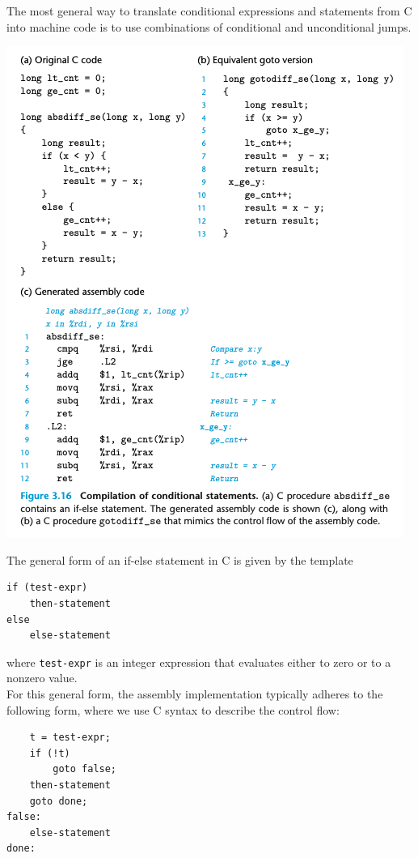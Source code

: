 \documentclass[11pt]{article}
\begin{document}
The most general way to translate conditional expressions and statements from C into machine code is to use combinations of conditional and unconditional jumps.\\

\begin{center}
\includegraphics[width=.9\linewidth]{pics/compilation-of-conditional-statements.png}
\end{center}

The general form of an if-else statement in C is given by the template\\
\begin{verbatim}
if (test-expr)
    then-statement
else
    else-statement
\end{verbatim}
where \texttt{test-expr} is an integer expression that evaluates either to zero or to a nonzero value.\\

For this general form, the assembly implementation typically adheres to the following form, where we use C syntax to describe the control flow:\\
\begin{verbatim}
    t = test-expr;
    if (!t)
        goto false;
    then-statement
    goto done;
false:
    else-statement
done:
\end{verbatim}
\end{document}
